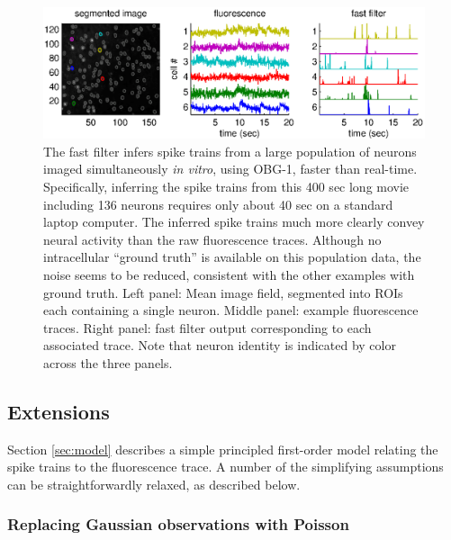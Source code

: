 \documentclass{article}
\newcommand{\foopsi}{fast }
\begin{document}
\begin{figure}[h!]
\begin{centering} 
\includegraphics[width=1\linewidth]{pop}
\end{centering}
\caption[\foopsi filter is robust and works online for populations of neurons]{The \foopsi filter infers spike trains from a large population of neurons imaged simultaneously \emph{in vitro}, using OBG-1, faster than real-time.  Specifically, inferring the spike trains from this 400 sec long movie including 136 neurons requires only about 40 sec on a standard laptop computer. The inferred spike trains much more clearly convey neural activity than the raw fluorescence traces.  Although no intracellular ``ground truth'' is available on this population data, the noise seems to be reduced, consistent with the other examples with ground truth.  Left panel: Mean image field, segmented into ROIs each containing a single neuron.  Middle panel: example fluorescence traces.  Right panel: \foopsi filter output corresponding to each associated trace. Note that neuron identity is indicated by color across the three panels.} \label{fig:pop}
\end{figure}


\subsection{Extensions}

Section \ref{sec:model} describes a simple principled first-order model relating the spike trains to the fluorescence trace. A number of the simplifying assumptions can be straightforwardly relaxed, as described below.


\subsubsection{Replacing Gaussian observations with Poisson}
\end{document}
